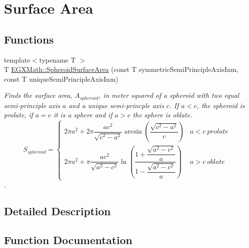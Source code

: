 \hypertarget{group___e_g_x_math-_geometry-3_d-_spheroid-_surface_area}{}\section{Surface Area}
\label{group___e_g_x_math-_geometry-3_d-_spheroid-_surface_area}
\subsection*{Functions}
\begin{DoxyCompactItemize}
\item 
{\footnotesize template$<$typename T $>$ }\\T \mbox{\hyperlink{group___e_g_x_math-_geometry-3_d-_spheroid-_surface_area_ga32a21d075102ea9a235a43165675627e}{E\+G\+X\+Math\+::\+Spheroid\+Surface\+Area}} (const T symmetric\+Semi\+Principle\+Axis\+Inm, const T unique\+Semi\+Principle\+Axis\+Inm)
\begin{DoxyCompactList}\small\item\em Finds the surface area, $A_{spheroid}$, in meter squared of a spheroid with two equal semi-\/principle axis $a$ and a unique semi-\/princple axis $c$. If $a < c$, the spheroid is prolate, if $a = c$ it is a sphere and if $a>c$ the sphere is oblate. \[ S_{spheroid}=\begin{cases} 2\pi a^2 + 2\pi\dfrac{a c^2}{\sqrt{c^2-a^2}}\arcsin \left ( \dfrac{\sqrt{c^2-a^2}}{c} \right ) & a<c\ prolate \\ 2\pi a^2 +\pi \dfrac{a c^2}{\sqrt{a^2-c^2}}\ln \left(\dfrac{1+\dfrac{\sqrt{a^2-c^2}}{a}}{1-\dfrac{\sqrt{a^2-c^2}}{a}}\right )& a>c\ oblate \end{cases} \]. \end{DoxyCompactList}\end{DoxyCompactItemize}


\subsection{Detailed Description}


\subsection{Function Documentation}
\mbox{\label{group___e_g_x_math-_geometry-3_d-_spheroid-_surface_area_ga32a21d075102ea9a235a43165675627e}} 
